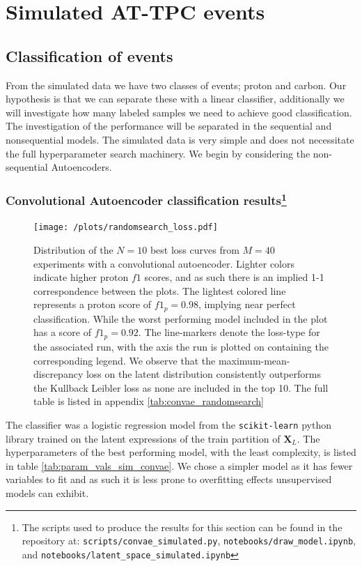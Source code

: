\section{Simulated AT-TPC events}


\subsection{Classification of events} 
From the simulated data we have two classes of events; proton and carbon. Our hypothesis is that we can separate these with a linear classifier, additionally we will investigate how many labeled samples we need to achieve good classification. The investigation of the performance will be separated in the sequential and non\-sequential models. The simulated data is very simple and does not necessitate the full hyperparameter search machinery. We begin by considering the non-sequential Autoencoders.

\subsubsection{Convolutional Autoencoder classification results\protect\footnote{The scripts used to produce the results for this section can be found in the repository at: \lstinline{scripts/convae_simulated.py}, \lstinline{notebooks/draw_model.ipynb}, and \lstinline{notebooks/latent_space_simulated.ipynb}}}

\begin{figure}[H]
\centering
\texttt{[image: /plots/randomsearch\_loss.pdf]}
\caption[Randomsearch loss curves for CONV-AE on simulated AT-TPC data]{Distribution of the $N=10$ best loss curves from $M=40$ experiments with a convolutional autoencoder. Lighter colors indicate higher proton $f1$ scores, and as such there is an implied 1-1 correspondence between the plots. The lightest colored line represents a proton score of $f1_p = 0.98$, implying near perfect classification. While the worst performing model included in the plot has a score of $f1_p = 0.92$. The line-markers denote the loss-type for the associated run, with the axis the run is plotted on containing the corresponding legend. We observe that the maximum-mean-discrepancy loss on the latent distribution consistently outperforms the Kullback Leibler loss as none are included in the top 10. The full table is listed in appendix \ref{tab:convae_randomsearch}}\label{fig:sim_clf_loss}
\end{figure}


The classifier was a logistic regression model from the \lstinline{scikit-learn} python library trained on the latent expressions of the train partition of $\mathbf{X}_L$. The hyperparameters of the best performing model, with the least complexity, is listed in table \ref{tab:param_vals_sim_convae}. We chose a simpler model as it has fewer variables to fit and as such it is less prone to overfitting effects unsupervised models can exhibit. 


